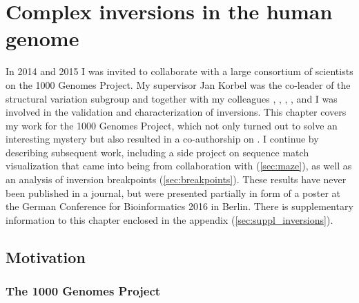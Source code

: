 \chapter{Complex inversions in the human genome}
\label{sec:complex_invs}


In 2014 and 2015 I was invited to collaborate with a large consortium of
scientists on the 1000 Genomes Project. My supervisor Jan Korbel was the
co-leader of the structural variation subgroup and together with my colleagues
\tobias, \adrian, \benjamin, \markus, and \andreas
I was involved in the validation and characterization of inversions.
This chapter covers my work for the 1000 Genomes Project, which not only turned
out to solve an interesting mystery but also resulted in a co-authorship on
\cite{Sudmant2015}. I continue by describing subsequent work, including a side
project on sequence match visualization that came into being from collaboration
with \markus (\cref{sec:maze}), as well as an analysis of inversion breakpoints
(\cref{sec:breakpoints}). These results have never been published in a journal,
but were presented partially in form of a poster at the German Conference for
Bioinformatics 2016 in Berlin. There is supplementary information to this
chapter enclosed in the appendix (\cref{sec:suppl_inversions}).





\section{Motivation}
\subsection{The 1000 Genomes Project}
\label{sec:1000G}

